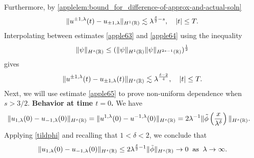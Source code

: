 %
%
Furthermore, by 
\cref{applelem:bound_for_difference-of-approx-and-actual-soln} 
%
%
\begin{equation}
\begin{split}
\|u^{\pm 1, \lambda}(t) - u_{\pm 1, \lambda} \|_{H^1(\mathbb{R})} \lesssim
\lambda^{\frac{\delta}{2} -s}, \quad |t| \le T.
\label{apple64}
\end{split}
\end{equation}
%
%
%
%
%
%
%
%
Interpolating between estimates \eqref{apple63} and \eqref{apple64} using 
the inequality
\begin{equation*}
\label{apple403}
\|\psi \|_{H^s (\mathbb{R})} \leq  (\| \psi \|_{H^1 (\mathbb{R})} \| \psi
\|_{H^{2s-1}(\mathbb{R})})^\frac12
\end{equation*}
%
%
gives
%
%
\begin{equation}
\begin{split}
\|u^{\pm 1, \lambda}(t) - u_{\pm 1, \lambda}(t)
\|_{H^s(\mathbb{R})}
\lesssim \lambda^{\frac{\delta -2}{4}}, \quad |t| \le T.
\label{apple65}
\end{split}
\end{equation}
%
%
Next, we will use estimate \eqref{apple65} to prove non-uniform
dependence when $s > 3/2$.
%
\textbf{Behavior at time $t=0$.}  We have
%
%
%
%
\begin{equation*}
\begin{split}
\|u_{1,\lambda}(0) - u_{-1,\lambda}(0) \|_{H^s(\mathbb{R})} & = \|u^{1,\lambda}(0) 
- u^{-1,\lambda}(0) \|_{H^s(\mathbb{R})}
= 2 \lambda^{-1} \| \tilde{\phi}\left( \frac{x}{\lambda^\delta}
\right) \|_{H^s(\mathbb{R})}.
\label{apple}
\end{split}
\end{equation*}
%
%
%
%
Applying \eqref{tildphi} and recalling that $1<\delta<2$, we conclude that
%
%
\begin{equation}
\begin{split}
\|u_{1,\lambda}(0) - u_{-1,\lambda}(0) \|_{H^s(\mathbb{R})} \le 2
\lambda^{\frac{\delta}{2}-1} \|\tilde{\phi} \|_{H^s(\mathbb{R})} \to 0
\; \; \text{as} \; \; \lambda \to \infty.
\label{apple70}
\end{split}
\end{equation}
%
%
%
%
%  
%

